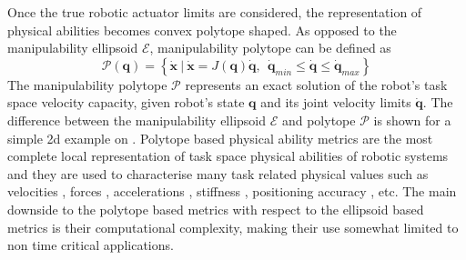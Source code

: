 Once the true robotic actuator limits are considered, the representation of physical abilities becomes convex polytope shaped. As opposed to the manipulability ellipsoid $\mathcal{E}$, manipulability polytope can be defined as
\begin{equation}
    \mathcal{P}(\bm{q}) = \left\{ \dot{\bm{x}} ~|~ \dot{\bm{x}} = J(\bm{q})\dot{\bm{q}},~~ \dot{\bm{q}}_{min}\leq\dot{\bm{q}} \leq \dot{\bm{q}}_{max} \right\}
\end{equation}
The manipulability polytope $\mathcal{P}$ represents an exact solution of the robot's task space velocity capacity, given robot's state $\bm{q}$
and its joint velocity limits $\dot{\bm{q}}$. The difference between the manipulability ellipsoid $\mathcal{E}$ and polytope $\mathcal{P}$ is shown for a simple 2d example on .
Polytope based physical ability metrics are the most complete local representation of task space physical abilities of robotic systems and they are used to characterise many task related physical values such as velocities \cite{Lee1997manip, long_constrained_2020}, forces \cite{chiacchio_evaluation_1996}, accelerations \cite{chiacchio_2000}, stiffness \cite{ajoudani2015role}, positioning accuracy \cite{pholsiri2005real}, etc.
The main downside to the polytope based metrics with respect to the ellipsoid based metrics is their computational complexity, making their use somewhat limited to non time critical applications.


